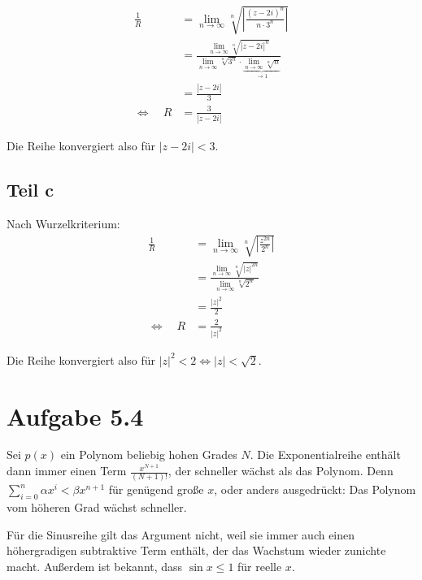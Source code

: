 \documentclass[a4paper,german,12pt,smallheadings]{scrartcl}
\begin{document}
\begin{align*}
  \frac{1}{R} &= \lim_{n \to \infty} \sqrt[n]{\left|\frac{(z-2i)^n}{n\cdot3^n}\right|} \\
              &= \frac{\lim_{n \to \infty} \sqrt[n]{|z-2i|^n}}{\lim_{n \to \infty} \sqrt[n]{3^n} \cdot \underbrace{\lim_{n \to \infty} \sqrt[n]{n}}_{\to 1}} \\
              &= \frac{|z-2i|}{3} \\
  \Leftrightarrow\quad R &= \frac{3}{|z-2i|}
\end{align*}

Die Reihe konvergiert also für $|z-2i| < 3$.

\subsection*{Teil c}
Nach Wurzelkriterium:
\begin{align*}
  \frac{1}{R} &= \lim_{n \to \infty} \sqrt[n]{\left|\frac{z^{2n}}{2^n}\right|} \\
              &= \frac{\lim_{n \to \infty} \sqrt[n]{|z|^{2n}}}{\lim_{n \to \infty} \sqrt[n]{2^n}} \\
              &= \frac{|z|^2}{2} \\
  \Leftrightarrow\quad R &= \frac{2}{|z|^2}
\end{align*}

Die Reihe konvergiert also für $|z|^2 < 2 \Leftrightarrow |z| < \sqrt{2}$.


\section{Aufgabe 5.4}

Sei $p(x)$ ein Polynom beliebig hohen Grades $N$. Die Exponentialreihe enthält
dann immer einen Term $\frac{x^{N+1}}{(N+1)!}$, der schneller wächst als das
Polynom. Denn $\sum_{i=0}^n \alpha x^i < \beta x^{n+1}$ für genügend große $x$,
oder anders ausgedrückt: Das Polynom vom höheren Grad wächst schneller.

Für die Sinusreihe gilt das Argument nicht, weil sie immer auch einen
höhergradigen subtraktive Term enthält, der das Wachstum wieder zunichte macht.
Außerdem ist bekannt, dass $\sin x \le 1$ für reelle $x$.
\end{document}
